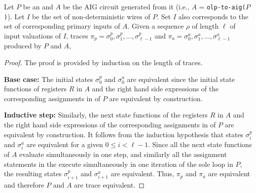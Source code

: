 %



\begin{theorem}
Let $P$ be an \caig and $A$ be the AIG circuit generated from it (i.e., $A$ = \texttt{olp-to-aig($P$)}). 
Let $I$ be the set of non-deterministic wires of $P$. 
Set $I$ also corresponds to the set of corresponding primary 
inputs of $A$. 
Given a sequence $\rho$ of length $\ell$ 
of input valuations of $I$, traces 
$\pi_p=\sigma^p_{0}, \sigma^p_{1}, \ldots, \sigma^p_{\ell-1}$ 
and 
$\pi_a=\sigma^a_{0}, \sigma^a_{1}, \ldots, \sigma^a_{\ell-1}$ 
produced by $P$ and $A$, 
\end{theorem}


\begin{proof}
The proof is provided by induction on the length of traces. 

{\bf Base case:} 
The initial states $\sigma^p_{0}$ and 
$\sigma^a_{0}$ are equivalent since the 
initial state functions of registers $R$ in $A$ and 
the right hand side expressions of the corresponding
assignments in  of $P$ are equivalent
by construction. 

{\bf Inductive step:} 
Similarly, the next state functions of the registers $R$ in $A$ 
and the right hand side expressions of the corresponding
assignments in  of $P$ are equivalent
by construction. 
It follows from the induction hypothesis 
that states $\sigma^p_{i}$ and $\sigma^a_{i}$ are 
equivalent for a given $0\le i < \ell -1$.
Since all the next state functions of $A$ 
evaluate simultaneously in one step,
and similarly all the assignment statements in the 
 execute simultaneously in one iteration of the 
sole loop in $P$, 
the resulting states $\sigma^p_{i+1}$ and $\sigma^a_{i+1}$ 
are equivalent. 
Thus, $\pi_p$ and $\pi_a$ are equivalent and therefore 
$P$ and $A$ are trace equivalent. 
\end{proof}

